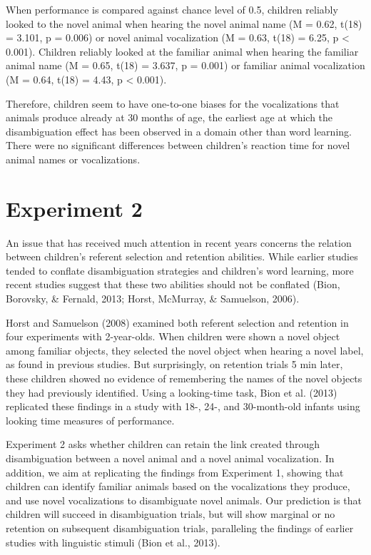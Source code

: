 \documentclass[english,floatsintext,man]{apa6}
\theoremstyle{definition}
\theoremstyle{definition}
\theoremstyle{definition}
\theoremstyle{remark}
\begin{document}
When performance is compared against chance level of 0.5, children
reliably looked to the novel animal when hearing the novel animal name
(M = 0.62, t(18) = 3.101, p = 0.006) or novel animal vocalization (M =
0.63, t(18) = 6.25, p \textless{} 0.001). Children reliably looked at
the familiar animal when hearing the familiar animal name (M = 0.65,
t(18) = 3.637, p = 0.001) or familiar animal vocalization (M = 0.64,
t(18) = 4.43, p \textless{} 0.001).

Therefore, children seem to have one-to-one biases for the vocalizations
that animals produce already at 30 months of age, the earliest age at
which the disambiguation effect has been observed in a domain other than
word learning. There were no significant differences between children's
reaction time for novel animal names or vocalizations.

\section{Experiment 2}\label{experiment-2}

An issue that has received much attention in recent years concerns the
relation between children's referent selection and retention abilities.
While earlier studies tended to conflate disambiguation strategies and
children's word learning, more recent studies suggest that these two
abilities should not be conflated (Bion, Borovsky, \& Fernald, 2013;
Horst, McMurray, \& Samuelson, 2006).

Horst and Samuelson (2008) examined both referent selection and
retention in four experiments with 2-year-olds. When children were shown
a novel object among familiar objects, they selected the novel object
when hearing a novel label, as found in previous studies. But
surprisingly, on retention trials 5 min later, these children showed no
evidence of remembering the names of the novel objects they had
previously identified. Using a looking-time task, Bion et al. (2013)
replicated these findings in a study with 18-, 24-, and 30-month-old
infants using looking time measures of performance.

Experiment 2 asks whether children can retain the link created through
disambiguation between a novel animal and a novel animal vocalization.
In addition, we aim at replicating the findings from Experiment 1,
showing that children can identify familiar animals based on the
vocalizations they produce, and use novel vocalizations to disambiguate
novel animals. Our prediction is that children will succeed in
disambiguation trials, but will show marginal or no retention on
subsequent disambiguation trials, paralleling the findings of earlier
studies with linguistic stimuli (Bion et al., 2013).
\end{document}
